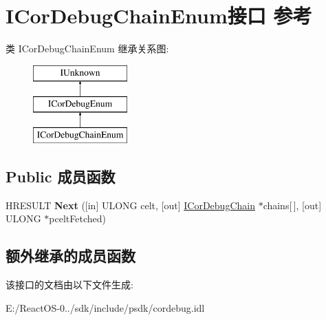 \hypertarget{interface_i_cor_debug_chain_enum}{}\section{I\+Cor\+Debug\+Chain\+Enum接口 参考}
\label{interface_i_cor_debug_chain_enum}
类 I\+Cor\+Debug\+Chain\+Enum 继承关系图\+:\begin{figure}[H]
\begin{center}
\leavevmode
\includegraphics[height=3.000000cm]{interface_i_cor_debug_chain_enum}
\end{center}
\end{figure}
\subsection*{Public 成员函数}
\begin{DoxyCompactItemize}
\item 
\mbox{\label{interface_i_cor_debug_chain_enum_a53b5437e760704335bd77171289fd42e}} 
H\+R\+E\+S\+U\+LT {\bfseries Next} (\mbox{[}in\mbox{]} U\+L\+O\+NG celt, \mbox{[}out\mbox{]} \hyperlink{interface_i_cor_debug_chain}{I\+Cor\+Debug\+Chain} $\ast$chains\mbox{[}$\,$\mbox{]}, \mbox{[}out\mbox{]} U\+L\+O\+NG $\ast$pcelt\+Fetched)
\end{DoxyCompactItemize}
\subsection*{额外继承的成员函数}


该接口的文档由以下文件生成\+:\begin{DoxyCompactItemize}
\item 
E\+:/\+React\+O\+S-\/0../sdk/include/psdk/cordebug.\+idl\end{DoxyCompactItemize}
